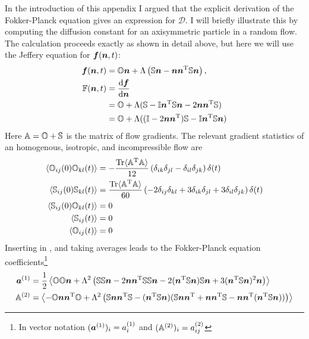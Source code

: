 \documentclass[thesis.tex]{subfiles}
\begin{document}
In the introduction of this appendix I argued that the explicit derivation of the Fokker-Planck equation gives an expression for $\mathcal D$. I will briefly illustrate this by computing the diffusion constant for an axisymmetric particle in a random flow. The calculation proceeds exactly as shown in detail above, but here we will use the Jeffery equation for $\mbox{\boldmath$f$}(\mbox{\boldmath$n$}, t)$:
\begin{align}
	\ve f(\ve n, t) &= \ma O \ve n + \Lambda\left(\ma S \ve n - \ve n \ve n\transpose\ma S \ve n\right), \nn\\
	\ma F(\ve n, t) &= \frac{\rd \ve f}{\rd \ve n} \nn\\
	&= \ma O + \Lambda(\ma S - \maid \ve n\transpose \ma S \ve n - 2\ve n\ve n\transpose \ma S) \nn\\
	& = \ma O + \Lambda( (\maid - 2\ve n \ve n\transpose)\ma S - \maid \ve n\transpose \ma S \ve n )\eqnlab{fjeffery}
\end{align}
Here $\mathbb{A} = \mathbb{O} + \mathbb{S}$ is the matrix of flow gradients.
The relevant gradient statistics of an homogenous, isotropic, and incompressible flow are
\begin{align}
	\left \langle \ma O_{ij}(0)\ma O_{kl}(t)\right \rangle &= -\frac{\tr\langle\ma A\transpose\ma A\rangle}{12}\left(\delta_{ik}\delta_{jl}-\delta_{il}\delta_{jk}\right)\delta(t)\nn\\
	\left \langle \ma S_{ij}(0)\ma S_{kl}(t)\right \rangle &= \frac{\tr\langle\ma A\transpose\ma A\rangle}{60}\left(-2\delta_{ij}\delta_{kl}+3\delta_{ik}\delta_{jl}+3\delta_{il}\delta_{jk}\right)	\delta(t)\nn\\
	\left \langle \ma S_{ij}(0)\ma O_{kl}(t)\right \rangle &= 0 \nn\\
	\left \langle \ma S_{ij}(t)\right \rangle &= 0 \nn\\
	\left \langle \ma O_{ij}(t)\right \rangle &= 0 \eqnlab{appisotropicos}
\end{align}
Inserting  in , and taking averages leads to the Fokker-Planck equation coefficients\footnote{In vector notation $(\mbox{\boldmath$a$}^{(1)})_i = a^{(1)}_i$ and $(\mathbb{A}^{(2)})_i = a^{(2)}_{ij}$}
\begin{align*}
	\mbox{\boldmath$a$}^{(1)} &= \frac{1}{2}\left \langle \mathbb{O} \mathbb{O} \mbox{\boldmath$n$} + \Lambda^2\left(
\mathbb{S} \mathbb{S} \mbox{\boldmath$n$}
-2 \mbox{\boldmath$n$} \mbox{\boldmath$n$}^{\mathrm T} \mathbb{S}\mathbb{S}\mbox{\boldmath$n$}
-2 (\mbox{\boldmath$n$}^{\mathrm T} \mathbb{S}\mbox{\boldmath$n$})\mathbb{S} \mbox{\boldmath$n$} 
+3 (\mbox{\boldmath$n$}^{\mathrm T} \mathbb{S}\mbox{\boldmath$n$})^2 \mbox{\boldmath$n$}
\right) \right\rangle\\
\mathbb{A}^{(2)}  &= \left\langle -\mathbb{O} \mbox{\boldmath$n$} \mbox{\boldmath$n$}^{\mathrm T} \mathbb{O} + \Lambda^2\left( \mathbb{S} \mbox{\boldmath$n$} \mbox{\boldmath$n$}^{\mathrm T}\mathbb{S} -(\mbox{\boldmath$n$}^{\mathrm T} \mathbb{S} \mbox{\boldmath$n$})(\mathbb{S} \mbox{\boldmath$n$} \mbox{\boldmath$n$}^{\mathrm T} + \mbox{\boldmath$n$} \mbox{\boldmath$n$}^{\mathrm T} \mathbb{S} - \mbox{\boldmath$n$} \mbox{\boldmath$n$}^{\mathrm T}(\mbox{\boldmath$n$}^{\mathrm T} \mathbb{S} \mbox{\boldmath$n$}))\right) \right\rangle
\end{align*}
\end{document}
